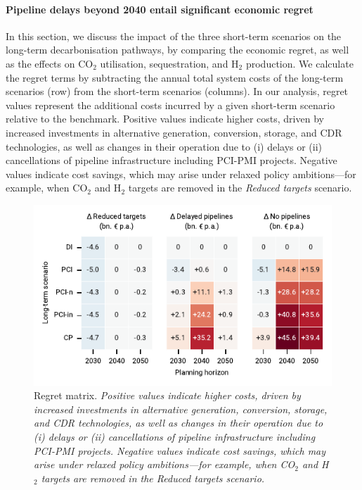 \documentclass[pdflatex,sn-nature]{sn-jnl}%
\theoremstyle{thmstyleone}%
\theoremstyle{thmstyletwo}%
\theoremstyle{thmstylethree}%
\begin{document}
\paragraph{Pipeline delays beyond 2040 entail significant economic regret}
In this section, we discuss the impact of the three short-term scenarios on the long-term decarbonisation pathways, by comparing the economic regret, as well as the effects on CO$_2$ utilisation, sequestration, and H$_2$ production. We calculate the regret terms by subtracting the annual total system costs of the long-term scenarios (row) from the short-term scenarios (columns). In our analysis, regret values represent the additional costs incurred by a given short-term scenario relative to the benchmark. Positive values indicate higher costs, driven by increased investments in alternative generation, conversion, storage, and CDR technologies, as well as changes in their operation due to (i) delays or (ii) cancellations of pipeline infrastructure including PCI-PMI projects. Negative values indicate cost savings, which may arise under relaxed policy ambitions—for example, when CO$_2$ and H$_2$ targets are removed in the \textit{Reduced targets} scenario.

\begin{figure}[htbp]
  \centering
  \includegraphics{figures/regret_matrix}
  \caption{Regret matrix. \textit{Positive values indicate higher costs, driven by increased investments in alternative generation, conversion, storage, and CDR technologies, as well as changes in their operation due to (i) delays or (ii) cancellations of pipeline infrastructure including PCI-PMI projects. Negative values indicate cost savings, which may arise under relaxed policy ambitions—for example, when CO$_2$ and H$_2$ targets are removed in the \textit{Reduced targets} scenario.}}
  \label{fig:regret_matrix_results}
\end{figure}
\end{document}
